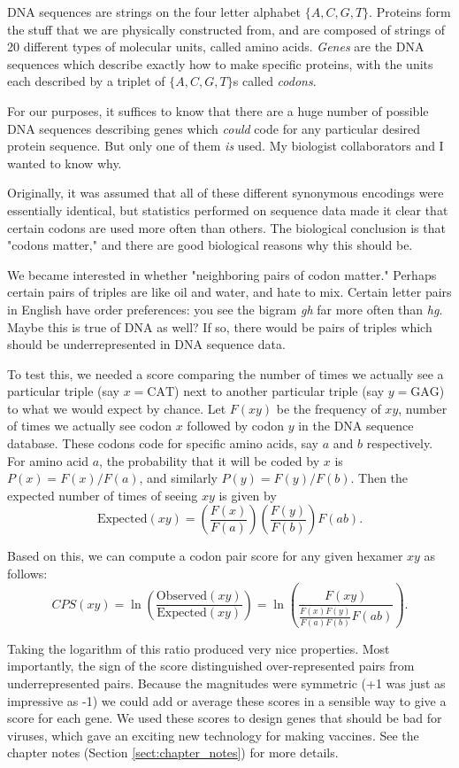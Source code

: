 \documentclass[10pt]{article}
\begin{document}
DNA sequences are strings on the four letter alphabet $\{A, C, G, T\}$. Proteins form the stuff that we are physically constructed from, and are composed of strings of 20 different types of molecular units, called amino acids. \textit{Genes} are the DNA sequences which describe exactly how to make specific proteins, with the units each described by a triplet of $\{A, C, G, T\}$s called \textit{codons}.

For our purposes, it suffices to know that there are a huge number of possible DNA sequences describing genes which \textit{could} code for any particular desired protein sequence. But only one of them \textit{is} used. My biologist collaborators and I wanted to know why.

Originally, it was assumed that all of these different synonymous encodings were essentially identical, but statistics performed on sequence data made it clear that certain codons are used more often than others. The biological conclusion is that "codons matter," and there are good biological reasons why this should be.

We became interested in whether "neighboring pairs of codon matter." Perhaps certain pairs of triples are like oil and water, and hate to mix. Certain letter pairs in English have order preferences: you see the bigram \textit{gh} far more often than \textit{hg}. Maybe this is true of DNA as well? If so, there would be pairs of triples which should be underrepresented in DNA sequence data.

To test this, we needed a score comparing the number of times we actually see a particular triple (say $x = \text{CAT}$) next to another particular triple (say $y = \text{GAG}$) to what we would expect by chance. Let $F(xy)$ be the frequency of $xy$, number of times we actually see codon $x$ followed by codon $y$ in the DNA sequence database. These codons code for specific amino acids, say $a$ and $b$ respectively. For amino acid $a$, the probability that it will be coded by $x$ is $P(x) = F(x) / F(a)$, and similarly $P(y) = F(y) / F(b)$. Then the expected number of times of seeing $xy$ is given by 
\[
\text{Expected}(xy) = \left(\frac{F(x)}{F(a)}\right)\left(\frac{F(y)}{F(b)}\right) F(ab).
\]

Based on this, we can compute a codon pair score for any given hexamer $xy$ as follows:
\[
CPS(xy) = \ln \left(\frac{\text{Observed}(xy)}{\text{Expected}(xy)}\right) = \ln \left(\frac{F(xy)}{\frac{F(x) F(y)}{F(a) F(b)} F(ab)}\right).
\]

Taking the logarithm of this ratio produced very nice properties. Most importantly, the sign of the score distinguished over-represented pairs from underrepresented pairs. Because the magnitudes were symmetric (+1 was just as impressive as -1) we could add or average these scores in a sensible way to give a score for each gene. We used these scores to design genes that should be bad for viruses, which gave an exciting new technology for making vaccines. See the chapter notes (Section \ref{sect:chapter_notes}) for more details.
\end{document}
